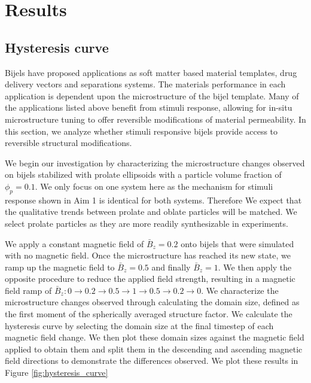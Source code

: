 \section{Results}\label{sec:results_p2}
\subsection{Hysteresis curve}\label{section:hysteresis_curve}

Bijels have proposed applications as soft matter based material templates, drug delivery vectors and separations systems. The materials 
performance in each application is dependent upon the microstructure of the bijel template. Many of the applications listed above benefit 
from stimuli response, allowing for in-situ microstructure tuning to offer reversible modifications of material permeability. In this section, we analyze
whether stimuli responsive bijels provide access to reversible structural modifications.

We begin our investigation by characterizing the microstructure changes observed on bijels stabilized with prolate ellipsoids with a 
particle volume fraction of $\phi_p = 0.1$. We only focus on one system here as the mechanism for stimuli response shown in Aim 1 is identical
for both systems. Therefore We expect that the qualitative trends between prolate and oblate particles will be matched. We select prolate particles
as they are more readily synthesizable in experiments. 

We apply a constant magnetic field of $\bar{B}_z = 0.2$ onto bijels that were simulated 
with no magnetic field. Once the microstructure has reached its new state, we ramp up the magnetic field to $\bar{B}_z = 0.5$ and 
finally $\bar{B}_z = 1$. We then apply the opposite procedure to reduce the applied field strength, resulting in a magnetic field 
ramp of $\bar{B}_z: 0 \rightarrow 0.2 \rightarrow 0.5 \rightarrow 1 \rightarrow 0.5 \rightarrow 0.2 \rightarrow 0$. We characterize the 
microstructure changes observed through calculating the domain size, defined as the first moment of the spherically averaged structure factor. 
We calculate the hysteresis 
curve by selecting the domain size at the final timestep of each magnetic field change. We then plot these domain sizes against the magnetic field 
applied to obtain them and split them in the descending and ascending magnetic field directions to demonstrate the differences observed. We plot 
these results in Figure \ref{fig:hysteresis_curve}

